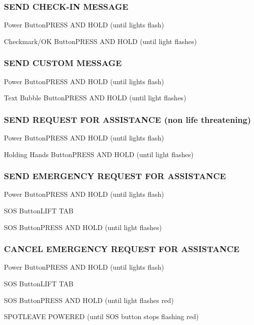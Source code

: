 \begin{multicols}{2}
\subsubsection*{SEND CHECK-IN MESSAGE}
\begin{enumerate*}
\item Power Button\dotfill PRESS AND HOLD (until lights flash)
\item Checkmark/OK Button\dotfill PRESS AND HOLD (until light flashes)
\end{enumerate*}

\subsubsection*{SEND CUSTOM MESSAGE}
\begin{enumerate*}
\item Power Button\dotfill PRESS AND HOLD (until lights flash)
\item Text Bubble Button\dotfill PRESS AND HOLD (until light flashes)
\end{enumerate*}

\subsubsection*{SEND REQUEST FOR ASSISTANCE (non life threatening)}
\begin{enumerate*}
\item Power Button\dotfill PRESS AND HOLD (until lights flash)
\item Holding Hands Button\dotfill PRESS AND HOLD (until light flashes)
\end{enumerate*}

\subsubsection*{SEND EMERGENCY REQUEST FOR ASSISTANCE}
\begin{enumerate*}
\item Power Button\dotfill PRESS AND HOLD (until lights flash)
\item SOS Button\dotfill LIFT TAB
\item SOS Button\dotfill PRESS AND HOLD (until light flashes)
\end{enumerate*}

\subsubsection*{CANCEL EMERGENCY REQUEST FOR ASSISTANCE}
\begin{enumerate*}
\item Power Button\dotfill PRESS AND HOLD (until lights flash)
\item SOS Button\dotfill LIFT TAB
\item SOS Button\dotfill PRESS AND HOLD (until light flashes red)
\item SPOT\dotfill LEAVE POWERED (until SOS button stops flashing red)
\end{enumerate*}

\end{multicols}

